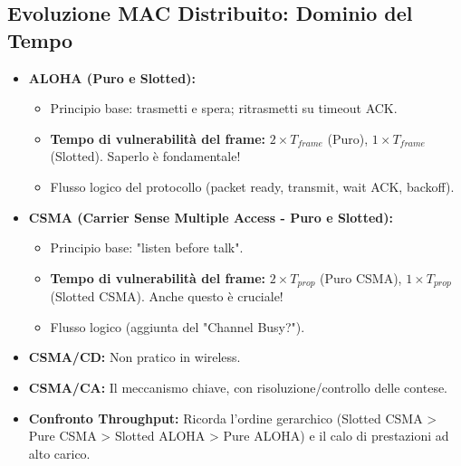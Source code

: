 \subsection{Evoluzione MAC Distribuito: Dominio del Tempo}
\begin{itemize}
    \item \textbf{ALOHA (Puro e Slotted):}
    \begin{itemize}
        \item Principio base: trasmetti e spera; ritrasmetti su timeout ACK.
        \item \textbf{Tempo di vulnerabilità del frame:} $2 \times T_{frame}$ (Puro), $1 \times T_{frame}$ (Slotted). Saperlo è fondamentale!
        \item Flusso logico del protocollo (packet ready, transmit, wait ACK, backoff).
    \end{itemize}
    \item \textbf{CSMA (Carrier Sense Multiple Access - Puro e Slotted):}
    \begin{itemize}
        \item Principio base: "listen before talk".
        \item \textbf{Tempo di vulnerabilità del frame:} $2 \times T_{prop}$ (Puro CSMA), $1 \times T_{prop}$ (Slotted CSMA). Anche questo è cruciale!
        \item Flusso logico (aggiunta del "Channel Busy?").
    \end{itemize}
    \item \textbf{CSMA/CD:} Non pratico in wireless.
    \item \textbf{CSMA/CA:} Il meccanismo chiave, con risoluzione/controllo delle contese.
    \item \textbf{Confronto Throughput:} Ricorda l'ordine gerarchico (Slotted CSMA > Pure CSMA > Slotted ALOHA > Pure ALOHA) e il calo di prestazioni ad alto carico.
\end{itemize}

